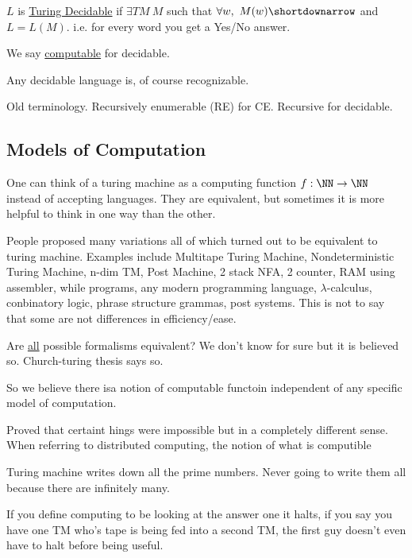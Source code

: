 \documentclass[../598comp.tex]{subfiles}
\begin{document}
\begin{definition}
  $L$ is \ul{Turing Decidable} if $\exists TM \ M$ such that $\forall w, \ M(w)
  \shortdownarrow$ and $L = L(M)$. i.e. for every word you get a Yes/No answer.

  We say \ul{computable} for decidable.
\end{definition}

\begin{fact}
  Any decidable language is, of course recognizable.
\end{fact}

\begin{note}
  Old terminology. Recursively enumerable (RE) for CE. Recursive for decidable.
\end{note}

\subsection{Models of Computation}

One can think of a turing machine as a computing function $f: \NN \to \NN$
instead of accepting languages. They are equivalent, but sometimes it is more
helpful to think in one way than the other.

People proposed many variations all of which turned out to be equivalent to
turing machine. Examples include Multitape Turing Machine, Nondeterministic
Turing Machine, n-dim TM, Post Machine, 2 stack NFA, 2 counter, RAM using
assembler, while programs, any modern programming language, $\lambda$-calculus,
conbinatory logic, phrase structure grammas, post systems. This is not to
say that some are not differences in efficiency/ease.

Are \ul{all} possible formalisms equivalent? We don't know for sure but it is
believed so. Church-turing thesis says so.

So we believe there isa notion of computable functoin independent of any
specific model of computation.

Proved that certaint hings were impossible but in a completely different sense.
When referring to distributed computing, the notion of what is computible 

Turing machine writes down all the prime numbers. Never going to write them all
because there are infinitely many.

If you define computing to be looking at the answer one it halts, if you say you
have one TM who's tape is being fed into a second TM, the first guy doesn't even
have to halt before being useful.
\end{document}

